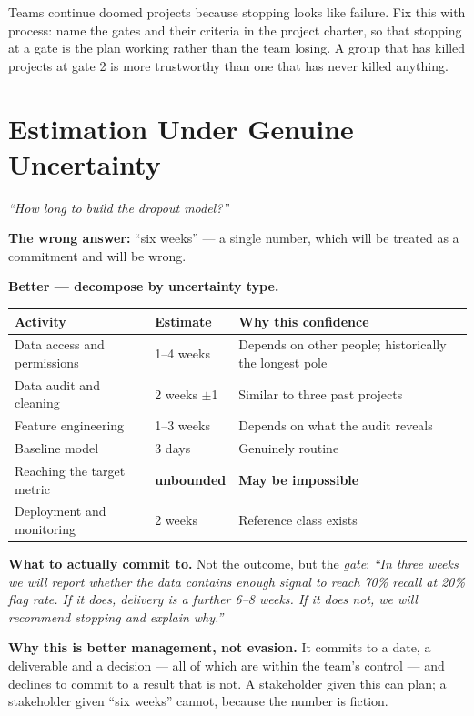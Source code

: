 \begin{conceptbox}
Teams continue doomed projects because stopping looks like failure. Fix this with
process: name the gates and their criteria in the project charter, so that stopping
at a gate is the plan working rather than the team losing. A group that has killed
projects at gate 2 is more trustworthy than one that has never killed anything.
\end{conceptbox}

\section{Estimation Under Genuine Uncertainty}

\begin{worked}
\emph{``How long to build the dropout model?''}

\smallskip
\textbf{The wrong answer:} ``six weeks'' --- a single number, which will be treated
as a commitment and will be wrong.

\smallskip
\textbf{Better --- decompose by uncertainty type.}
\begin{center}
\begin{tabular}{@{}L{4.3cm}L{2.6cm}L{6.2cm}@{}}
\toprule
\textbf{Activity} & \textbf{Estimate} & \textbf{Why this confidence} \\
\midrule
Data access and permissions & 1--4 weeks & Depends on other people; historically the
longest pole \\
Data audit and cleaning & 2 weeks $\pm$1 & Similar to three past projects \\
Feature engineering & 1--3 weeks & Depends on what the audit reveals \\
Baseline model & 3 days & Genuinely routine \\
Reaching the target metric & \textbf{unbounded} & \textbf{May be impossible} \\
Deployment and monitoring & 2 weeks & Reference class exists \\
\bottomrule
\end{tabular}
\end{center}

\smallskip
\textbf{What to actually commit to.} Not the outcome, but the \emph{gate}:
\emph{``In three weeks we will report whether the data contains enough signal to
reach 70\% recall at 20\% flag rate. If it does, delivery is a further 6--8 weeks.
If it does not, we will recommend stopping and explain why.''}

\smallskip
\textbf{Why this is better management, not evasion.} It commits to a date, a
deliverable and a decision --- all of which are within the team's control --- and
declines to commit to a result that is not. A stakeholder given this can plan; a
stakeholder given ``six weeks'' cannot, because the number is fiction.
\end{worked}

